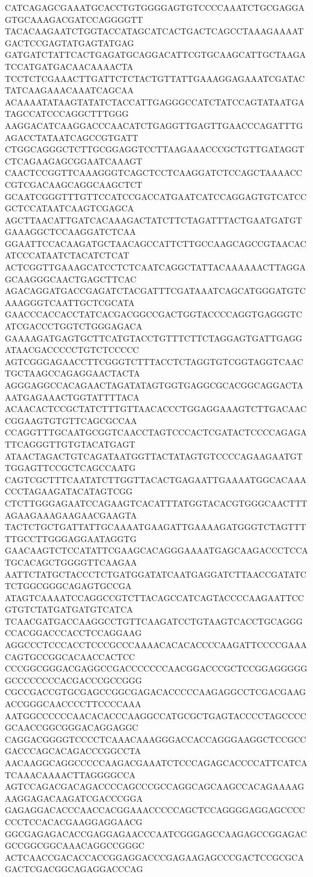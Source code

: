 CATCAGAGCGAAATGCACCTGTGGGGAGTGTCCCCAAATCTGCGAGGAGTGCAAAGACGATCCAGGGGTT
TACACAAGAATCTGGTACCATAGCATCACTGACTCAGCCTAAAGAAAATGACTCCGAGTATGAGTATGAG
GATGATCTATTCACTGAGATGCAGGACATTCGTGCAAGCATTGCTAAGATCCATGATGACAACAAAACTA
TCCTCTCGAAACTTGATTCTCTACTGTTATTGAAAGGAGAAATCGATACTATCAAGAAACAAATCAGCAA
ACAAAATATAAGTATATCTACCATTGAGGGCCATCTATCCAGTATAATGATAGCCATCCCAGGCTTTGGG
AAGGACATCAAGGACCCAACATCTGAGGTTGAGTTGAACCCAGATTTGAGACCTATAATCAGCCGTGATT
CTGGCAGGGCTCTTGCGGAGGTCCTTAAGAAACCCGCTGTTGATAGGTCTCAGAAGAGCGGAATCAAAGT
CAACTCCGGTTCAAAGGGTCAGCTCCTCAAGGATCTCCAGCTAAAACCCGTCGACAAGCAGGCAAGCTCT
GCAATCGGGTTTGTTCCATCCGACCATGAATCATCCAGGAGTGTCATCCGCTCCATAATCAAGTCGAGCA
AGCTTAACATTGATCACAAAGACTATCTTCTAGATTTACTGAATGATGTGAAAGGCTCCAAGGATCTCAA
GGAATTCCACAAGATGCTAACAGCCATTCTTGCCAAGCAGCCGTAACACATCCCATAATCTACATCTCAT
ACTCGGTTGAAAGCATCCTCTCAATCAGGCTATTACAAAAAACTTAGGAGCAAGGGCAACTGAGCTTCAC
AGACAGGATGACCGAGATCTACGATTTCGATAAATCAGCATGGGATGTCAAAGGGTCAATTGCTCGCATA
GAACCCACCACCTATCACGACGGCCGACTGGTACCCCAGGTGAGGGTCATCGACCCTGGTCTGGGAGACA
GAAAAGATGAGTGCTTCATGTACCTGTTTCTTCTAGGAGTGATTGAGGATAACGACCCCCTGTCTCCCCC
AGTCGGGAGAACCTTCGGGTCTTTACCTCTAGGTGTCGGTAGGTCAACTGCTAAGCCAGAGGAACTACTA
AGGGAGGCCACAGAACTAGATATAGTGGTGAGGCGCACGGCAGGACTAAATGAGAAACTGGTATTTTACA
ACAACACTCCGCTATCTTTGTTAACACCCTGGAGGAAAGTCTTGACAACCGGAAGTGTGTTCAGCGCCAA
CCAGGTTTGCAATGCGGTCAACCTAGTCCCACTCGATACTCCCCAGAGATTCAGGGTTGTGTACATGAGT
ATAACTAGACTGTCAGATAATGGTTACTATAGTGTCCCCAGAAGAATGTTGGAGTTCCGCTCAGCCAATG
CAGTCGCTTTCAATATCTTGGTTACACTGAGAATTGAAAATGGCACAAACCCTAGAAGATACATAGTCGG
CTCTTGGGAGAATCCAGAAGTCACATTTATGGTACACGTGGGCAACTTTAGAAGAAAGAAGAACGAAGTA
TACTCTGCTGATTATTGCAAAATGAAGATTGAAAAGATGGGTCTAGTTTTTGCCTTGGGAGGAATAGGTG
GAACAAGTCTCCATATTCGAAGCACAGGGAAAATGAGCAAGACCCTCCATGCACAGCTGGGGTTCAAGAA
AATTCTATGCTACCCTCTGATGGATATCAATGAGGATCTTAACCGATATCTCTGGCGGGCAGAGTGCCGA
ATAGTCAAAATCCAGGCCGTCTTACAGCCATCAGTACCCCAAGAATTCCGTGTCTATGATGATGTCATCA
TCAACGATGACCAAGGCCTGTTCAAGATCCTGTAAGTCACCTGCAGGGCCACGGACCCACCTCCAGGAAG
AGGCCCTCCCACCTCCCGCCCAAAACACACACCCCAAGATTCCCCGAAACAGTGCCGGCACAACCACTCC
CCCGGCGGGACGAGGCCGACCCCCCCAACGGACCCGCTCCGGAGGGGGGCCCCCCCCACGACCCGCCGGG
CGCCGACCGTGCGAGCCGGCGAGACACCCCCAAGAGGCCTCGACGAAGACCGGGCAACCCCTTCCCCAAA
AATGGCCCCCCAACACACCCAAGGCCATGCGCTGAGTACCCCTAGCCCCGCAACCGGCGGGACAGGAGGC
CAGGACGGGGTCCCCTCAAACAAAGGGACCACCAGGGAAGGCTCCGCCGACCCAGCACAGACCCGGCCTA
AACAAGGCAGGCCCCCAAGACGAAATCTCCCAGAGCACCCCATTCATCATCAAACAAAACTTAGGGGCCA
AGTCCAGACGACAGACCCCAGCCCGCCAGGCAGCAAGCCACAGAAAAGAAGGAGACAAGATCGACCCGGA
GAGAGGACACCCAACCACGGAAACCCCCAGCTCCAGGGGAGGAGCCCCCCCTCCACACGAAGGAGGAACG
GGCGAGAGACACCGAGGAGAACCCAATCGGGAGCCAAGAGCCGGAGACGCCGGCGGCAAACAGGCCGGGC
ACTCAACCGACACCACCGGAGGACCCGAGAAGAGCCCGACTCCGCGCAGACTCGACGGCAGAGGACCCAG
